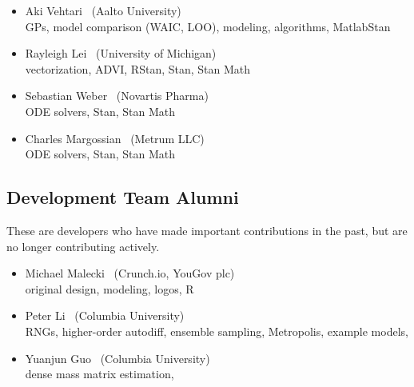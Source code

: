 \begin{itemize}
\item Aki Vehtari \ (Aalto University)
\\ {\footnotesize GPs, model comparison (WAIC, LOO), modeling,
  algorithms, MatlabStan}
\item Rayleigh Lei \ (University of Michigan)
\\ {\footnotesize vectorization, ADVI, RStan, Stan, Stan Math}
\item Sebastian Weber \ (Novartis Pharma)
\\ {\footnotesize ODE solvers, Stan, Stan Math}
\item Charles Margossian \ (Metrum LLC)
\\ {\footnotesize ODE solvers, Stan, Stan Math}
\end{itemize}

\subsection*{Development Team Alumni}

These are developers who have made important contributions in the
past, but are no longer contributing actively.

\begin{itemize}
\item Michael Malecki \ (Crunch.io, YouGov plc)
\\ {\footnotesize original design, modeling, logos, R}
\item Peter Li \   (Columbia University)
\\ {\footnotesize RNGs, higher-order autodiff, ensemble sampling,
  Metropolis, example models, \Cpp}
\item Yuanjun Guo \ (Columbia University)
\\ {\footnotesize dense mass matrix estimation, \Cpp}
\end{itemize}

